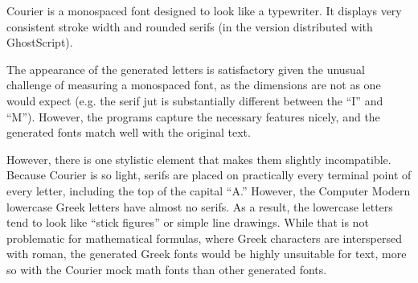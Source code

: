 
Courier is a monospaced font designed to look like a typewriter. It displays
very consistent stroke width and rounded serifs (in the version distributed with
GhostScript).

The appearance of the generated letters is satisfactory given the unusual
challenge of measuring a monospaced font, as the dimensions are not as one would
expect (e.g. the serif jut is substantially different between the ``I'' and
``M''). However, the programs capture the necessary features nicely, and the
generated fonts match well with the original text.

However, there is one stylistic element that makes them slightly incompatible.
Because Courier is so light, serifs are placed on practically every terminal
point of every letter, including the top of the capital ``A.'' However, the
Computer Modern lowercase Greek letters have almost no serifs. As a result, the
lowercase letters tend to look like ``stick figures'' or simple line drawings.
While that is not problematic for mathematical formulas, where Greek characters
are interspersed with roman, the generated Greek fonts would be highly
unsuitable for text, more so with the Courier mock math fonts than other
generated fonts.
